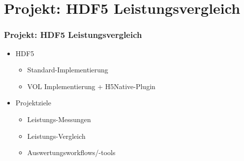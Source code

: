 \section{Projekt: HDF5 Leistungsvergleich}
\begin{frame}
	\frametitle{Projekt: HDF5 Leistungsvergleich}
	\begin{itemize}
		\item HDF5
			\begin{itemize}
				\item Standard-Implementierung
				\item VOL Implementierung + H5Native-Plugin
			\end{itemize}
	\end{itemize}

	\begin{itemize}
		\item Projektziele
			\begin{itemize}
				\item Leistungs-Messungen
				\item Leistungs-Vergleich
				\item Auswertungsworkflows/-tools
			\end{itemize}
	\end{itemize}
\end{frame}



